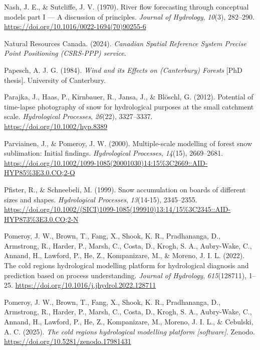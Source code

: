 \documentclass[
  letterpaper,
]{tex/uofsthesis-cs}
\newlength{\cslhangindent}
\newenvironment{CSLReferences}[2] %
 {\begin{list}{}{%
  \setlength{\itemindent}{0pt}
  \setlength{\leftmargin}{0pt}
  \setlength{\parsep}{0pt}
  \ifodd #1
   \setlength{\leftmargin}{\cslhangindent}
   \setlength{\itemindent}{-1\cslhangindent}
  \fi
  \setlength{\itemsep}{#2\baselineskip}}}
 {\end{list}}
\begin{document}
\begin{CSLReferences}{1}{0}
Nash, J. E., \& Sutcliffe, J. V. (1970). River flow forecasting through
conceptual models part {I} --- {A} discussion of principles.
\emph{Journal of Hydrology}, \emph{10}(3), 282--290.
\url{https://doi.org/10.1016/0022-1694(70)90255-6}

Natural Resources Canada. (2024). \emph{Canadian {Spatial Reference
System Precise Point Positioning} ({CSRS-PPP}) service}.

Papesch, A. J. G. (1984). \emph{Wind and its {Effects} on ({Canterbury})
{Forests}} {[}PhD thesis{]}. University of Canterbury.

Parajka, J., Haas, P., Kirnbauer, R., Jansa, J., \& Blöschl, G. (2012).
Potential of time-lapse photography of snow for hydrological purposes at
the small catchment scale. \emph{Hydrological Processes}, \emph{26}(22),
3327--3337. \url{https://doi.org/10.1002/hyp.8389}

Parviainen, J., \& Pomeroy, J. W. (2000). Multiple-scale modelling of
forest snow sublimation: {Initial} findings. \emph{Hydrological
Processes}, \emph{14}(15), 2669--2681.
\url{https://doi.org/10.1002/1099-1085(20001030)14:15\%3C2669::AID-HYP85\%3E3.0.CO;2-Q}

Pfister, R., \& Schneebeli, M. (1999). Snow accumulation on boards of
different sizes and shapes. \emph{Hydrological Processes},
\emph{13}(14-15), 2345--2355.
\url{https://doi.org/10.1002/(SICI)1099-1085(199910)13:14/15\%3C2345::AID-HYP873\%3E3.0.CO;2-N}

Pomeroy, J. W., Brown, T., Fang, X., Shook, K. R., Pradhananga, D.,
Armstrong, R., Harder, P., Marsh, C., Costa, D., Krogh, S. A.,
Aubry-Wake, C., Annand, H., Lawford, P., He, Z., Kompanizare, M., \&
Moreno, J. I. L. (2022). The cold regions hydrological modelling
platform for hydrological diagnosis and prediction based on process
understanding. \emph{Journal of Hydrology}, \emph{615}(128711), 1--25.
\url{https://doi.org/10.1016/j.jhydrol.2022.128711}

Pomeroy, J. W., Brown, T., Fang, X., Shook, K. R., Pradhananga, D.,
Armstrong, R., Harder, P., Marsh, C., Costa, D., Krogh, S. A.,
Aubry-Wake, C., Annand, H., Lawford, P., He, Z., Kompanizare, M.,
Moreno, J. I. L., \& Cebulski, A. C. (2025). \emph{The cold regions
hydrological modelling platform {[}software{]}}. Zenodo.
\url{https://doi.org/10.5281/zenodo.17981431}


\end{CSLReferences}
\end{document}
